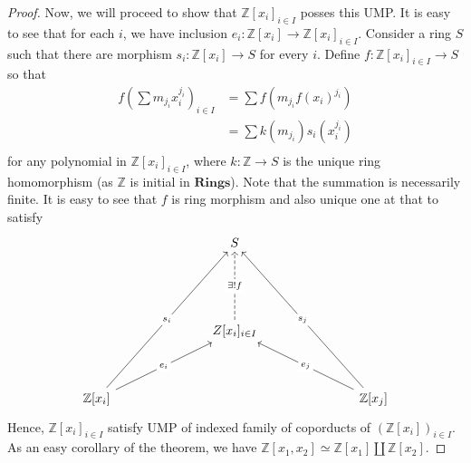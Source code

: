 \documentclass[a4paper, 11pt]{book}
\theoremstyle{plain}
\theoremstyle{plain}
\newcommand{\mb}{\mathbf}
\newcommand{\arr}{\rightarrow}
\newcommand{\Z}{\mathbb{Z}}
\begin{document}
\begin{proof}
  Now, we will proceed to show that $\Z[x_i]_{i \in I}$ posses this UMP. It is easy to see that for each $i$, we have inclusion $e_i:\Z[x_i] \arr \Z[x_i]_{i \in I}$. Consider a ring $S$ such that there are morphism $s_i:\Z[x_i] \arr S$ for every $i$. Define $f:\Z[x_i]_{i \in I} \arr S$ so that 
  \begin{align*}
    f \left( \sum m_{j_i} x_i^{j_i} \right)_{i \in I} &= \sum f(m_{j_i} f (x_i)^{j_i}) \\
    &= \sum k(m_{j_i}) s_i(x_i^{j_i}) \\
  \end{align*}
  for any polynomial in $\Z[x_i]_{i \in I}$, where $k:\Z \arr S$ is the unique ring homomorphism (as $\Z$ is initial in $\mb{Rings}$). Note that the summation is necessarily finite. It is easy to see that $f$ is ring morphism and also unique one at that to satisfy 
  \[\begin{tikzcd}
    &&& S \\
    \\
    \\
    &&& {Z[x_i]_{i \in I}} \\
    \\
    {\Z[x_i]} &&&&&& {\Z[x_j]}
    \arrow["{\exists ! f}"{description}, dashed, from=4-4, to=1-4]
    \arrow["{s_i}"{description}, from=6-1, to=1-4]
    \arrow["{s_j}"{description}, from=6-7, to=1-4]
    \arrow["{e_i}"{description}, from=6-1, to=4-4]
    \arrow["{e_j}"{description}, from=6-7, to=4-4]
  \end{tikzcd}\]
  Hence, $\Z[x_i]_{i \in I}$ satisfy UMP of indexed family of coporducts of $(\Z[x_i])_{i \in I}$. As an easy corollary of the theorem, we have $\Z[x_1,x_2] \simeq \Z[x_1] \coprod \Z[x_2]$.
\end{proof}
\end{document}

